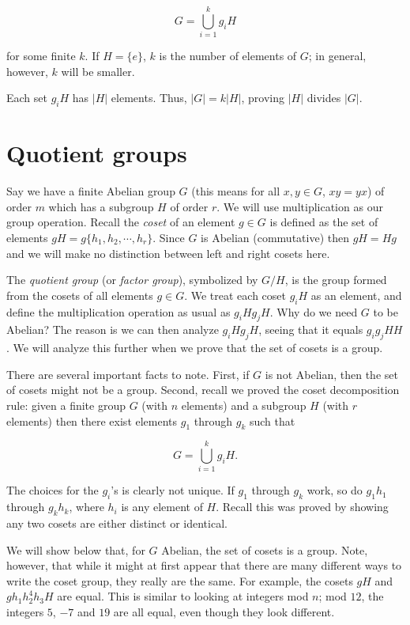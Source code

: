 \documentclass[12pt,letterpaper]{article}
\newcommand\be{\begin{equation}}
\newcommand\ee{\end{equation}}
\begin{document}
\be
G = \bigcup_{i = 1}^k g_i H
\ee

for some finite $k$. If $H = \{e\}$, $k$ is the number of elements
of $G$; in general, however, $k$ will be smaller.

Each set $g_i H$ has $|H|$ elements. Thus, $|G| = k|H|$, proving
$|H|$ divides $|G|$.


\section{Quotient groups}

Say we have a finite Abelian group $G$ (this means for all $x, y
\in G$, $xy = yx$) of order $m$ which has a subgroup $H$ of order
$r$. We will use multiplication as our group operation. Recall the
{\em coset} of an element $g\in G$ is defined as the set of
elements $gH = g\{h_1,h_2,\cdots,h_r\}$. Since $G$ is Abelian
(commutative) then $gH = Hg$ and we will make no distinction
between left and right cosets here.

The {\em quotient group} (or {\em factor group}), symbolized by
$G/H$, is the group formed from the cosets of all elements $g\in
G$. We treat each coset $g_i H$ as an element, and define the
multiplication operation as usual as $g_i H g_j H$. Why do we need
$G$ to be Abelian? The reason is we can then analyze $g_i H g_j
H$, seeing that it equals $g_i g_j H H$. We will analyze this
further when we prove that the set of cosets is a group.

There are several important facts to note. First, if $G$ is not
Abelian, then the set of cosets might not be a group. Second,
recall we proved the coset decomposition rule: given a finite
group $G$ (with $n$ elements) and a subgroup $H$ (with $r$
elements) then there exist elements $g_1$ through $g_k$ such that

\be
G = \bigcup_{i=1}^k g_i H. \ee

The choices for the $g_i$'s is clearly not unique. If $g_1$
through $g_k$ work, so do $g_1 h_1$ through $g_k h_k$, where $h_i$
is any element of $H$. Recall this was proved by showing any two
cosets are either distinct or identical.

We will show below that, for $G$ Abelian, the set of cosets is a
group. Note, however, that while it might at first appear that
there are many different ways to write the coset group, they
really are the same. For example, the cosets $gH$ and $g h_1 h_2^4
h_3 H$ are equal. This is similar to looking at integers mod $n$;
mod $12$, the integers $5$, $-7$ and $19$ are all equal, even
though they look different.
\end{document}
